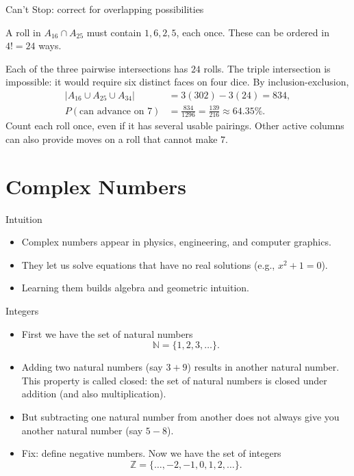 \begin{frame}[t]{Can't Stop: correct for overlapping possibilities}
\small
\begin{sol}
A roll in $A_{16}\cap A_{25}$ must contain $1,6,2,5$, each once.
These can be ordered in $4!=24$ ways.

\medskip
Each of the three pairwise intersections has $24$ rolls. The triple
intersection is impossible: it would require six distinct faces on four dice.
By inclusion-exclusion,
\begin{align*}
|A_{16}\cup A_{25}\cup A_{34}|
 &=3(302)-3(24)=834,\\
P(\text{can advance on }7)
 &=\frac{834}{1296}=\boxed{\frac{139}{216}\approx64.35\%}.
\end{align*}
Count each roll once, even if it has several usable pairings.
Other active columns can also provide moves on a roll that cannot make $7$.
\end{sol}
\end{frame}

\section{Complex Numbers}
\frame{\sectionpage}

\begin{frame}{Intuition}
  \begin{itemize}
    \item Complex numbers appear in physics, engineering, and computer graphics.
    \item They let us solve equations that have no real solutions (e.g., $x^2+1=0$).
    \item Learning them builds algebra and geometric intuition.
  \end{itemize}
\end{frame}

\begin{frame}{Integers}
  \begin{itemize}
  \item First we have the set of natural numbers 
  \[\mathbb{N} =\{1,2,3,\ldots\}.\]
  \item Adding two natural numbers (say $3+9$) results in another natural number. This property is called closed: the set of natural numbers is closed under addition (and also multiplication).
  \item But subtracting one natural number from another does not always give you another natural number (say $5-8$).
  \item Fix: define negative numbers. Now we have the set of integers 
  \[\mathbb{Z} = \{\ldots, -2,-1,0,1,2,\ldots\}.\]
  \end{itemize}
\end{frame}

